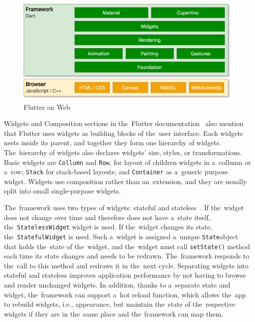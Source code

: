 \begin{figure}
    \centering
    \includegraphics[width=1\linewidth]{assets/design/flutterweb.png}
    \caption{Flutter on Web~\cite{a2022_flutter_architecture}}
    \label{fig:design:flutterweb}
\end{figure}

\pagebreak

Widgets and Composition sections in the~Flutter documentation~\cite{a2022_flutter_architecture} also mention that Flutter uses widgets as building blocks of the~user interface.
Each widgets nests inside its parent, and together they form one hierarchy of widgets.
The~hierarchy of widgets also declares widgets' size, styles, or transformations.
Basic widgets are \texttt{Collumn} and \texttt{Row}, for layout of children widgets in a~collumn or a~row; \texttt{Stack} for stack-based layouts; and \texttt{Container} as a~generic purpose widget.
Widgets use composition rather than an~extension, and they are usually split into small single-purpose widgets.

The~framework uses two types of widgets: stateful and stateless~\cite{a2022_flutter_architecture}.
\linebreak
If the~widget does not change over time and therefore does not have a~state itself, the~\texttt{StatelessWidget} widget is used.
If the~widget changes its state, the~\texttt{StatefulWidget} is used.
Such a~widget is assigned a~unique \texttt{State}\linebreak{}object that holds the~state of the~widget, and the~widget must call \texttt{setState()} method each time its state changes and needs to be redrawn.
The~framework responds to the~call to this method and redraws it in the~next cycle.
Separating widgets into stateful and stateless improves application performance by not having to browse and render unchanged widgets.
In addition, thanks to a~separate state and widget, the~framework can support a~hot reload function, which allows the~app to rebuild widgets, i.e., appearance, but maintain the~state of the~respective widgets if they are in the~same place and the~framework can map them.

